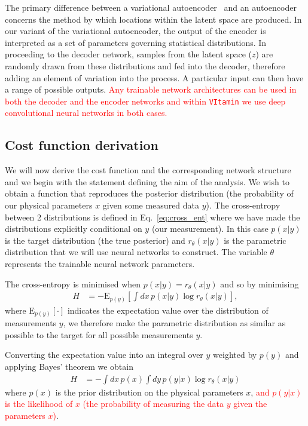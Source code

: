 \documentclass[%
showpacs,
nofootinbib,
 amsmath,amssymb,
 aps,
 twocolumn,
 prl,
 reprint,
floatfix,
]{revtex4-1}
\newcommand{\new}[1]{\textcolor{red}{#1}}
\begin{document}
%
%
The primary difference between a variational autoencoder~\cite{1812.04405} and
an autoencoder concerns the method by which locations within the latent space
are produced. In our variant of the variational autoencoder, the output of the
encoder is interpreted as a set of parameters governing statistical
distributions. In proceeding to the decoder network, samples from the latent
space ($z$) are randomly drawn from these distributions and fed into the
decoder, therefore adding an element of variation into the process. A
particular input can then have a range of possible outputs. \new{Any trainable
network architectures can be used in both the decoder and the encoder networks
and within \texttt{VItamin} we use deep convolutional neural networks in both
cases.}

\subsection{Cost function derivation}
%
%
We will now derive the cost function and the corresponding network structure
and we begin with the statement defining the aim of the analysis. We wish to
obtain a function that reproduces the posterior distribution (the probability
of our physical parameters $x$ given some measured data $y$). The cross-entropy
between 2 distributions is defined in Eq.~\ref{eq:cross_ent} where we have made
the distributions explicitly conditional on $y$ (our measurement). In this case
$p(x|y)$ is the target distribution (the true posterior) and $r_{\theta}(x|y)$
is the parametric distribution that we will use neural networks to construct.
The variable $\theta$ represents the trainable neural network parameters. 

%
%
The cross-entropy is minimised when $p(x|y)=r_{\theta}(x|y)$ and so by
minimising
%
\begin{align}\label{eq:cost1}
H &= -\text{E}_{p(y)}\left[\int dx\,p(x|y) \log r_{\theta}(x|y)\right],
\end{align}
% 
where $\text{E}_{p(y)}[\cdot]$ indicates the expectation value over the
distribution of measurements $y$, we therefore make the parametric distribution
as similar as possible to the target for all possible measurements $y$.

%
%
Converting the expectation value into an integral over $y$ weighted by $p(y)$
and applying Bayes' theorem we obtain
%
\begin{align}\label{eq:cost1}
H &= -\int dx\,p(x)\int dy\,p(y|x)\log r_{\theta}(x|y)
\end{align}
%
where $p(x)$ is the prior distribution on the physical parameters $x$, \new{and
$p(y|x)$ is the likelihood of $x$ (the probability of measuring the data $y$
given the parameters $x$)}. 
\end{document}
